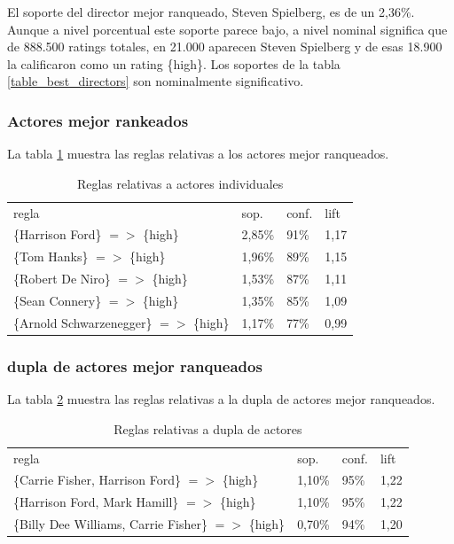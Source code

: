 \documentclass[journal]{IEEEtran}
\begin{document}
El soporte del director mejor ranqueado, Steven Spielberg, es de un 2,36\%. Aunque a nivel
porcentual este soporte parece bajo, a nivel nominal significa que de 888.500 ratings
totales, en 21.000 aparecen Steven Spielberg y de esas 18.900 la calificaron como un
rating \{high\}. Los soportes de la tabla \ref{table_best_directors} 
son nominalmente significativo. 

\subsubsection{Actores mejor rankeados}
La tabla \ref{table_best_cast}   muestra las reglas relativas a los actores 
mejor ranqueados.
\begin{table}[ht!]
\caption{Reglas relativas a actores individuales}
\label{table_best_cast}
\centering
\begin{tabular}{l l l l }
regla & sop. & conf. & lift \\
\{Harrison Ford\} $=$$>$ \{high\} & 2,85\% & 91\% & 1,17 \\
\{Tom Hanks\} $=$$>$ \{high\} & 1,96\% & 89\% & 1,15 \\
\{Robert De Niro\} $=$$>$ \{high\} & 1,53\% & 87\% & 1,11 \\
\{Sean Connery\} $=$$>$ \{high\} & 1,35\% & 85\% & 1,09 \\
\{Arnold Schwarzenegger\} $=$$>$ \{high\} & 1,17\% & 77\% & 0,99
\end{tabular}
\end{table}


\subsubsection{dupla de actores mejor ranqueados}
La tabla \ref{table_best_tuple}   muestra las reglas relativas a la 
dupla de  actores mejor ranqueados.
\begin{table}[ht!]
\caption{Reglas relativas a dupla de actores}
\label{table_best_tuple}
\centering
\begin{tabular}{l l l l }
regla & sop. & conf. & lift \\
\{Carrie Fisher, Harrison Ford\} $=$$>$ \{high\} & 1,10\% & 95\% & 1,22 \\
\{Harrison Ford, Mark Hamill\} $=$$>$ \{high\} & 1,10\% & 95\% & 1,22 \\
\{Billy Dee Williams, Carrie Fisher\} $=$$>$ \{high\} & 0,70\% & 94\% & 1,20 \\
\end{tabular}
\end{table}
\end{document}
